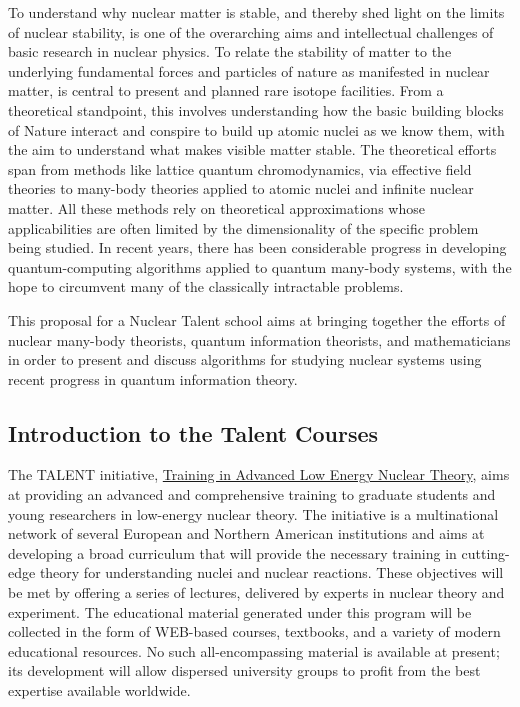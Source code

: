 \documentclass[twocolumn,superscriptaddress,amsmath,amssymb,aps,floatfix]{revtex4-2}
\begin{document}
To understand why nuclear matter is stable, and thereby shed light on
the limits of nuclear stability, is one of the overarching aims and
intellectual challenges of basic research in nuclear physics. To relate
the stability of matter to the underlying fundamental forces and
particles of nature as manifested in nuclear matter, is central to
present and planned rare isotope facilities. From a theoretical
standpoint, this involves understanding how the basic building blocks of
Nature interact and conspire to build up atomic nuclei as we know them,
with the aim to understand what makes visible matter stable. The
theoretical efforts span from methods like lattice quantum
chromodynamics, via effective field theories to many-body theories
applied to atomic nuclei and infinite nuclear matter. All these methods
rely on theoretical approximations whose applicabilities are often
limited by the dimensionality of the specific problem being studied. In
recent years, there has been considerable progress in 
developing quantum-computing algorithms
applied to quantum many-body systems, with the hope to circumvent many of the 
classically intractable problems.

This proposal for a Nuclear Talent school aims at bringing together the
efforts of nuclear many-body theorists, quantum information theorists,
and mathematicians in order to present and discuss algorithms for
studying nuclear systems using recent progress in quantum information
theory.

    \subsection{Introduction to the Talent
Courses}\label{introduction-to-the-talent-courses}

The TALENT initiative, \href{http://www.nucleartalent.org}{Training in
Advanced Low Energy Nuclear Theory}, aims at providing an advanced and
comprehensive training to graduate students and young researchers in
low-energy nuclear theory. The initiative is a multinational network
of several European and Northern American institutions and aims at
developing a broad curriculum that will provide %
the necessary training in cutting-edge theory for understanding nuclei and nuclear reactions.
These objectives will be met by offering a series of lectures,
delivered by 
experts in nuclear theory and experiment.
The educational material generated under this program will be collected
in the form of WEB-based courses, textbooks, and a variety of modern
educational resources. No such all-encompassing material is available at
present; its development will allow dispersed university groups to
profit from the best expertise available worldwide.
\end{document}

